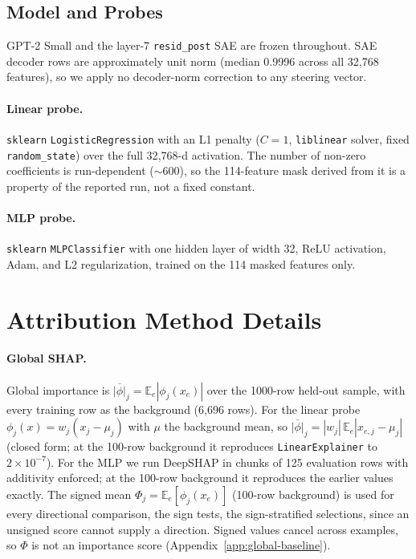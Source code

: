 \subsection{Model and Probes}
\label{app:model}
\label{app:probes}

GPT-2 Small and the layer-7 \texttt{resid\_post} SAE are frozen throughout.
SAE decoder rows are approximately unit norm (median 0.9996 across all
32{,}768 features), so we apply no decoder-norm correction to any steering
vector.

\paragraph{Linear probe.} \texttt{sklearn} \texttt{LogisticRegression}
with an L1 penalty ($C=1$, \texttt{liblinear} solver, fixed
\texttt{random\_state}) over the full 32{,}768-d activation. The number of
non-zero coefficients is run-dependent ($\sim$600), so the 114-feature
mask derived from it is a property of the reported run, not a fixed
constant.

\paragraph{MLP probe.} \texttt{sklearn} \texttt{MLPClassifier} with one
hidden layer of width 32, ReLU activation, Adam, and L2 regularization,
trained on the 114 masked features only.

\clearpage
\section{Attribution Method Details}
\label{app:attribution}

\paragraph{Global SHAP.} Global importance is
$\overline{|\phi|}_j=\mathbb{E}_e|\phi_j(x_e)|$ over the 1000-row held-out
sample, with every training row as the background (6{,}696 rows). For the
linear probe $\phi_j(x)=w_j(x_j-\mu_j)$ with $\mu$ the background mean, so
$\overline{|\phi|}_j=|w_j|\,\mathbb{E}_e|x_{e,j}-\mu_j|$ (closed form; at the
100-row background it reproduces \texttt{LinearExplainer} to $2\times10^{-7}$).
For the MLP we run DeepSHAP in chunks of 125 evaluation rows with additivity
enforced; at the 100-row background it reproduces the earlier values exactly.
The signed mean $\Phi_j=\mathbb{E}_e[\phi_j(x_e)]$ (100-row background) is
used for every directional comparison, the sign tests, the sign-stratified
selections, since an unsigned score cannot
supply a direction. Signed values cancel across examples, so $\Phi$ is not an
importance score (Appendix~\ref{app:global-baseline}).

